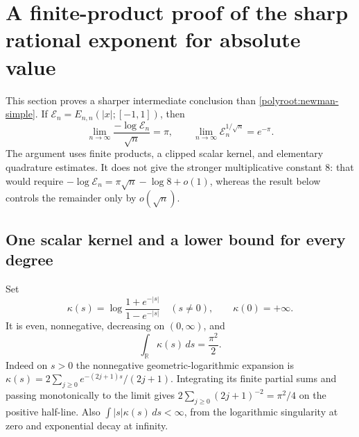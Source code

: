 \documentclass[11pt]{article}
\newcommand{\R}{\mathbb R}
\theoremstyle{remark}
\numberwithin{equation}{section}
\begin{document}
\section{A finite-product proof of the sharp rational exponent for absolute value}
\label{retryroot:sharp-rate}
This section proves a sharper intermediate conclusion than
\eqref{polyroot:newman-simple}. If
$\mathcal E_n=E_{n,n}(|x|;[-1,1])$, then
\begin{equation}\label{retryroot:root-limit}
 \lim_{n\to\infty}\frac{-\log\mathcal E_n}{\sqrt n}=\pi,
 \qquad
 \lim_{n\to\infty}\mathcal E_n^{1/\sqrt n}=e^{-\pi}.
\end{equation}
The argument uses finite products, a clipped scalar kernel, and elementary
quadrature estimates. It does not give the stronger multiplicative
constant $8$: that would require
$-\log\mathcal E_n=\pi\sqrt n-\log8+o(1)$, whereas the result below
controls the remainder only by $o(\sqrt n)$.

\subsection{One scalar kernel and a lower bound for every degree}
Set
\[
 \kappa(s)=\log\frac{1+e^{-|s|}}{1-e^{-|s|}}\quad(s\ne0),
 \qquad \kappa(0)=+\infty.
\]
It is even, nonnegative, decreasing on $(0,\infty)$, and
\begin{equation}\label{retryroot:kernel-mass}
 \int_{\R}\kappa(s)\,ds=\frac{\pi^2}{2}.
\end{equation}
Indeed on $s>0$ the nonnegative geometric-logarithmic expansion is
$\kappa(s)=2\sum_{j\ge0}e^{-(2j+1)s}/(2j+1)$.
Integrating its finite partial sums and passing monotonically to the
limit gives $2\sum_{j\ge0}(2j+1)^{-2}=\pi^2/4$ on the positive half-line.
Also $\int |s|\kappa(s)\,ds<\infty$, from the logarithmic singularity at
zero and exponential decay at infinity.
\end{document}
